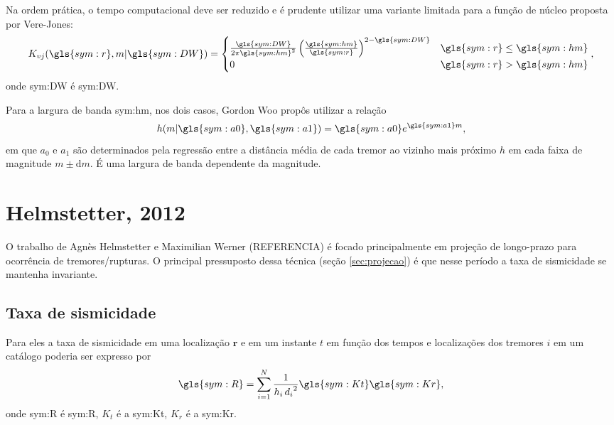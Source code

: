 Na ordem prática, o tempo computacional deve ser reduzido e é prudente utilizar uma
variante limitada para a função de núcleo proposta por Vere-Jones:\begin{equation}
	\ensuremath{
		K_{vj}(\gls{sym:r}, m \arrowvert \gls{sym:DW}) = 
		\begin{cases}
			\frac{\gls{sym:DW}}{2\pi \gls{sym:hm}^2} 
			\left( \frac{\gls{sym:hm}}{\gls{sym:r}} \right)^{2 - \gls{sym:DW}} 
			  & \gls{sym:r} \leq \gls{sym:hm} \\
			0 & \gls{sym:r} > \gls{sym:hm}
		\end{cases},
	}
	\label{eq:krm2}
\end{equation}
onde \gls{sym:DW} é \glsdesc{sym:DW}.

Para a largura de banda \gls{sym:hm}, nos dois casos, Gordon Woo propôs utilizar a relação
\begin{equation}
	\ensuremath{
		h(m\arrowvert \gls{sym:a0}, \gls{sym:a1}) = \gls{sym:a0}e^{\gls{sym:a1}m},
	}
	\label{eq:krm2}
\end{equation}
em que $a_0$ e $a_1$ são determinados pela regressão entre a 
distância média de cada tremor ao vizinho mais próximo $h$ em cada faixa de magnitude $m \pm \mathrm{d}m$.
É uma largura de banda dependente da magnitude.


\section{Helmstetter, 2012}
\label{sec:helmstetter}

O trabalho de  Agnès Helmstetter e Maximilian Werner (REFERENCIA) é focado principalmente em 
projeção de longo-prazo para ocorrência de tremores/rupturas. 
O principal pressuposto dessa técnica (seção \ref{sec:projecao}) é que nesse período a taxa
de sismicidade se mantenha invariante.

\subsection{Taxa de sismicidade}
Para eles a taxa de sismicidade em uma localização
$\boldsymbol{r}$ e em um instante $t$ 
em função dos tempos e localizações dos tremores $i$ em um catálogo 
poderia ser expresso por
\begin{equation}
	\ensuremath{\gls{sym:R} = \sum_{i=1}^{N}{ \frac{1}{h_i\,{d_i}^2} \gls{sym:Kt}\gls{sym:Kr} }},
	\label{eq:helms01}
\end{equation}
onde \gls{sym:R} é \glsdesc{sym:R}, 
	  $K_t$ é a \glsdesc{sym:Kt}, 
	  $K_r$ é a \glsdesc{sym:Kr}.

